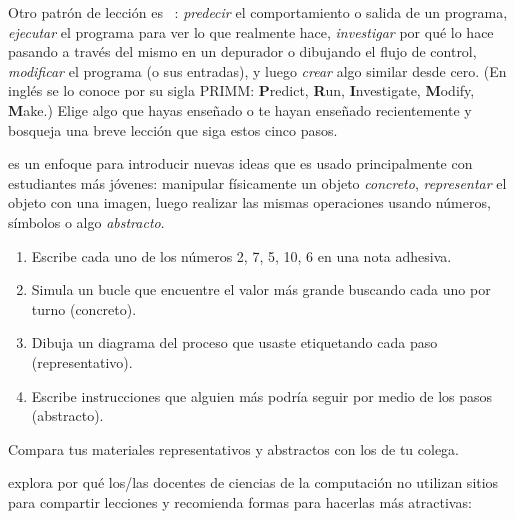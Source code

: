 Otro patrón de lección es ~\cite{Sent2019}:
\emph{predecir} el comportamiento o salida de un programa,
\emph{ejecutar} el programa para ver lo que realmente hace,
\emph{investigar} por qué lo hace pasando a través del mismo en un depurador o dibujando el flujo de control,
\emph{modificar} el programa (o sus entradas),
y luego \emph{crear} algo similar desde cero.
(En inglés se lo conoce por su sigla PRIMM: 
\textbf{P}redict, \textbf{R}un, \textbf{I}nvestigate, \textbf{M}odify, \textbf{M}ake.)
Elige algo que hayas enseñado o te hayan enseñado recientemente
y bosqueja una breve lección que siga estos cinco pasos.
 
 
 
 es un enfoque para introducir nuevas ideas
que es usado principalmente con estudiantes más jóvenes:
manipular físicamente un objeto \emph{concreto},
\emph{representar} el objeto con una imagen,
luego realizar las mismas operaciones
usando números, símbolos o algo \emph{abstracto}.
 \begin{enumerate}
 
\item
  Escribe cada uno de los números 2, 7, 5, 10, 6 en una nota adhesiva.
 
\item
  Simula un bucle que encuentre el valor más grande buscando cada uno por turno (concreto).
 
\item
 Dibuja un diagrama del proceso que usaste etiquetando cada paso (representativo).
 
\item
  Escribe instrucciones que alguien más podría seguir por medio de los pasos (abstracto).
\end{enumerate}
 
 
Compara tus materiales representativos y abstractos con los de tu colega.
 
 
\cite{Leak2017} explora por qué los/las docentes de ciencias de la computación
no utilizan sitios para compartir lecciones y recomienda formas para hacerlas más atractivas:
 
